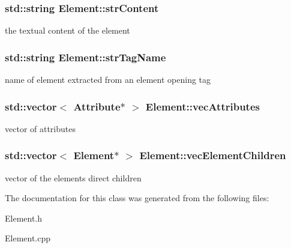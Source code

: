 \subsubsection[{str\+Content}]{\setlength{\rightskip}{0pt plus 5cm}std\+::string Element\+::str\+Content\hspace{0.3cm}{\ttfamily [private]}}\label{class_element_a0074c635f8cdfb1c76a5feb5b564a992}
the textual content of the element \hypertarget{class_element_ae0a8fe73a08103598092d5c10d80dcfe}{}
\subsubsection[{str\+Tag\+Name}]{\setlength{\rightskip}{0pt plus 5cm}std\+::string Element\+::str\+Tag\+Name\hspace{0.3cm}{\ttfamily [private]}}\label{class_element_ae0a8fe73a08103598092d5c10d80dcfe}
name of element extracted from an element opening tag \hypertarget{class_element_a020f955746d986f934c4b4be82cfdcc0}{}
\subsubsection[{vec\+Attributes}]{\setlength{\rightskip}{0pt plus 5cm}std\+::vector$<$ {\bf Attribute}$\ast$ $>$ Element\+::vec\+Attributes\hspace{0.3cm}{\ttfamily [private]}}\label{class_element_a020f955746d986f934c4b4be82cfdcc0}
vector of attributes \hypertarget{class_element_afc5e4b6ea250fd1aab288c9ce76d081e}{}
\subsubsection[{vec\+Element\+Children}]{\setlength{\rightskip}{0pt plus 5cm}std\+::vector$<$ {\bf Element}$\ast$ $>$ Element\+::vec\+Element\+Children\hspace{0.3cm}{\ttfamily [private]}}\label{class_element_afc5e4b6ea250fd1aab288c9ce76d081e}
vector of the element\textquotesingle{}s direct children 

The documentation for this class was generated from the following files\+:\begin{DoxyCompactItemize}
\item 
Element.\+h\item 
Element.\+cpp\end{DoxyCompactItemize}
